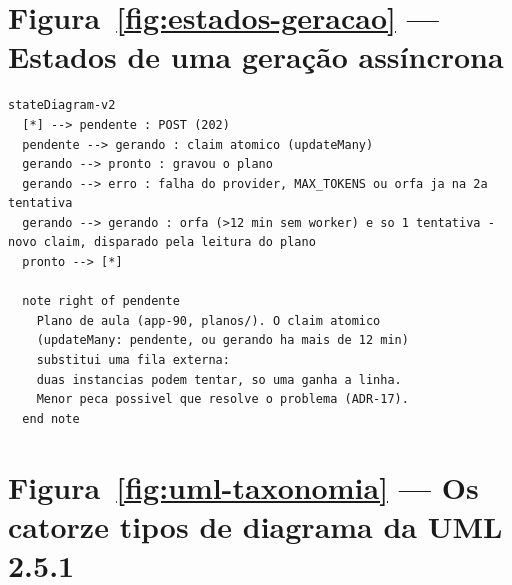 \section{Figura~\ref{fig:estados-geracao} --- Estados de uma geração assíncrona}

\begin{lstlisting}[language=mermaid]
stateDiagram-v2
  [*] --> pendente : POST (202)
  pendente --> gerando : claim atomico (updateMany)
  gerando --> pronto : gravou o plano
  gerando --> erro : falha do provider, MAX_TOKENS ou orfa ja na 2a tentativa
  gerando --> gerando : orfa (>12 min sem worker) e so 1 tentativa - novo claim, disparado pela leitura do plano
  pronto --> [*]

  note right of pendente
    Plano de aula (app-90, planos/). O claim atomico
    (updateMany: pendente, ou gerando ha mais de 12 min)
    substitui uma fila externa:
    duas instancias podem tentar, so uma ganha a linha.
    Menor peca possivel que resolve o problema (ADR-17).
  end note
\end{lstlisting}

\section{Figura~\ref{fig:uml-taxonomia} --- Os catorze tipos de diagrama da UML 2.5.1}

